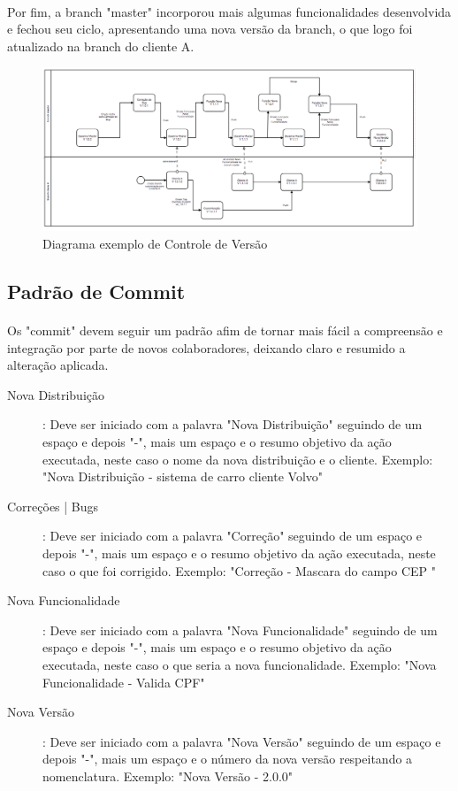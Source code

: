 \documentclass[	DIV=calc,%
							paper=a4,%
							fontsize=12pt,%
							onecolumn]{scrartcl}	 					%
\begin{document}
\paragraph{}
Por fim, a branch "master" incorporou mais algumas funcionalidades desenvolvida e fechou seu ciclo, apresentando uma nova versão da branch, o que logo foi atualizado na branch do cliente A.

\begin{figure}[!h]
	\caption{Diagrama exemplo de Controle de Versão}
	\includegraphics[scale=0.4]{diagrama_branch}
\end{figure}

\subsection{Padrão de Commit}
\paragraph{}
Os "commit" devem seguir um padrão afim de tornar mais fácil a compreensão e integração por parte de novos colaboradores, deixando claro e resumido a alteração aplicada.
\begin{description}
	\item[Nova Distribuição]: Deve ser iniciado com a palavra "Nova Distribuição" seguindo de um espaço e depois "-", mais um espaço e o resumo objetivo da ação executada, neste caso o nome da nova distribuição e o cliente. Exemplo: "Nova Distribuição - sistema de carro cliente Volvo"
	\item[Correções | Bugs]: Deve ser iniciado com a palavra "Correção" seguindo de um espaço e depois "-", mais um espaço e o resumo objetivo da ação executada, neste caso o que foi corrigido. Exemplo: "Correção - Mascara do campo CEP "
	\item[Nova Funcionalidade]: Deve ser iniciado com a palavra "Nova Funcionalidade" seguindo de um espaço e depois "-", mais um espaço e o resumo objetivo da ação executada, neste caso o que seria a nova funcionalidade. Exemplo: "Nova Funcionalidade - Valida CPF"
	\item[Nova Versão]: Deve ser iniciado com a palavra "Nova Versão" seguindo de um espaço e depois "-", mais um espaço e o número da nova versão respeitando a nomenclatura. Exemplo: "Nova Versão - 2.0.0"
\end{description}
\end{document}
